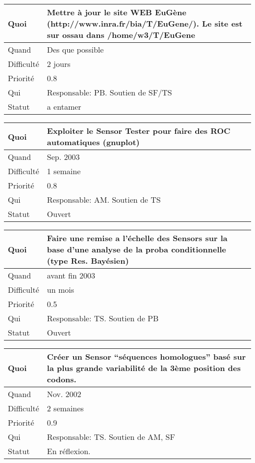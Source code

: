 \documentclass[a4paper,11pt]{article}
\begin{document}
\begin{longtable}{|l|p{7cm}|}\hline
  Quoi & Mettre \`a jour le site WEB EuG\`ene (http://www.inra.fr/bia/T/EuGene/). Le site est sur ossau dans /home/w3/T/EuGene\\\hline
  Quand  &  Des que possible \\\hline
  Difficult\'e &  2 jours \\\hline
  Priorit\'e &  0.8 \\\hline
  Qui & Responsable: PB. Soutien de SF/TS\\\hline
  Statut & a entamer\\\hline
\end{longtable}

\begin{longtable}{|l|p{7cm}|}\hline
  Quoi & Exploiter le Sensor Tester pour faire des ROC automatiques (gnuplot)\\\hline
  Quand  &  Sep. 2003\\\hline
  Difficult\'e &  1 semaine \\\hline
  Priorit\'e &  0.8\\\hline
  Qui & Responsable: AM. Soutien de TS\\\hline
  Statut & Ouvert\\\hline
\end{longtable}

\begin{longtable}{|l|p{7cm}|}\hline
  Quoi & Faire une remise a l'\'echelle des Sensors sur la base d'une analyse de la proba conditionnelle (type Res. Bay\'esien)\\\hline
  Quand  &  avant fin 2003\\\hline
  Difficult\'e &  un mois\\\hline
  Priorit\'e &  0.5 \\\hline
  Qui & Responsable: TS. Soutien de PB\\\hline
  Statut & Ouvert\\\hline
\end{longtable}

\begin{longtable}{|l|p{7cm}|}\hline
  Quoi & Cr\'eer un Sensor ``s\'equences homologues'' bas\'e sur la
  plus grande variabilit\'e de la 3\`eme position des codons.\\\hline
  Quand  & Nov. 2002 \\\hline
  Difficult\'e &  2 semaines\\\hline
  Priorit\'e &  0.9 \\\hline
  Qui & Responsable: TS. Soutien de AM, SF\\\hline
  Statut & En r\'eflexion.\\\hline
\end{longtable}
\end{document}
